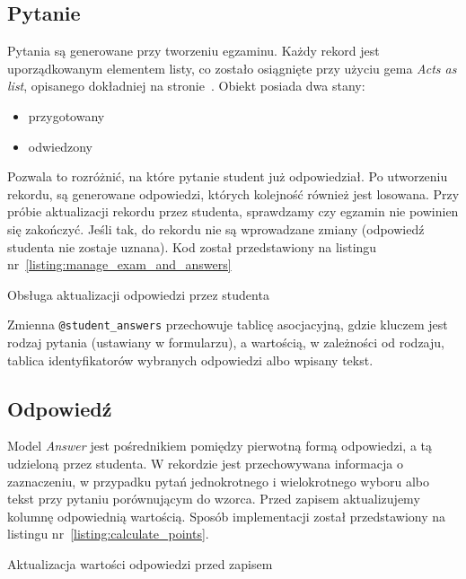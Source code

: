 \documentclass[12pt,twoside]{report}
\begin{document}
\subsection{Pytanie}
Pytania są generowane przy tworzeniu egzaminu. Każdy rekord jest uporządkowanym elementem
listy, co zostało osiągnięte przy użyciu gema \emph{Acts as list}, opisanego dokładniej na
stronie~\pageref{sec:acts_as_list}. Obiekt posiada dwa stany:

\begin{itemize}
  \item{przygotowany}
  \item{odwiedzony}
\end{itemize}


Pozwala to rozróżnić, na które pytanie student już odpowiedział. Po utworzeniu rekordu, są
generowane odpowiedzi, których kolejność również jest losowana. Przy próbie aktualizacji
rekordu przez studenta, sprawdzamy czy egzamin nie powinien się zakończyć. Jeśli tak,
do rekordu nie są wprowadzane zmiany (odpowiedź studenta nie zostaje uznana). Kod został
przedstawiony na listingu nr~\ref{listing:manage_exam_and_answers}

\begin{listing}
  
  \caption{Obsługa aktualizacji odpowiedzi przez studenta}
  \label{listing:manage_exam_and_answers}
\end{listing}


Zmienna \texttt{@student\_answers} przechowuje tablicę asocjacyjną, gdzie kluczem jest
rodzaj pytania (ustawiany w formularzu), a wartością, w zależności od rodzaju,
tablica identyfikatorów wybranych odpowiedzi albo wpisany tekst.

\subsection{Odpowiedź}
Model \emph{Answer} jest pośrednikiem pomiędzy pierwotną formą odpowiedzi, a tą udzieloną
przez studenta. W rekordzie jest przechowywana informacja o zaznaczeniu, w przypadku pytań
jednokrotnego i wielokrotnego wyboru albo tekst przy pytaniu porównującym do wzorca. Przed
zapisem aktualizujemy kolumnę odpowiednią wartością. Sposób implementacji został
przedstawiony na listingu nr~\ref{listing:calculate_points}.

\begin{listing}
  
  \caption{Aktualizacja wartości odpowiedzi przed zapisem}
  \label{listing:calculate_points}
\end{listing}
\end{document}
